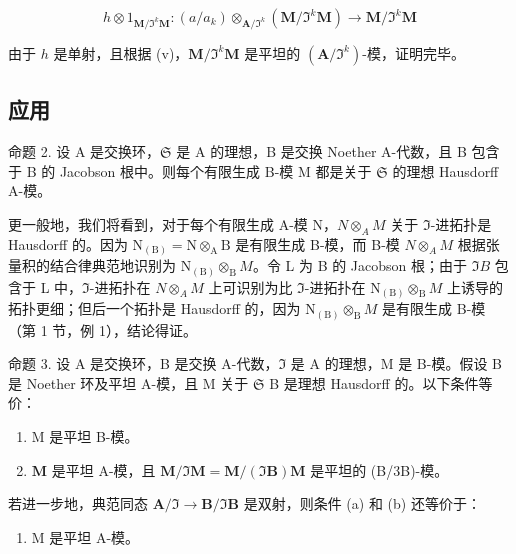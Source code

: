 \[
h \otimes 1 _ {\mathbf {M} / \Im^ {k} \mathbf {M}}: (a / a _ {k}) \otimes_ {\mathbf {A} / \Im^ {k}} (\mathbf {M} / \Im^ {k} \mathbf {M}) \rightarrow \mathbf {M} / \Im^ {k} \mathbf {M}
\]

由于 \(h\) 是单射，且根据 (v)，\(\mathbf{M} / \Im^k\mathbf{M}\) 是平坦的 \((\mathbf{A} / \Im^k)\)-模，证明完毕。

\subsection{应用}

命题 2. 设 A 是交换环，\(\mathfrak{S}\) 是 A 的理想，B 是交换 Noether A-代数，且 B 包含于 B 的 Jacobson 根中。则每个有限生成 B-模 M 都是关于 \(\mathfrak{S}\) 的理想 Hausdorff A-模。

更一般地，我们将看到，对于每个有限生成 A-模 N，\(N \otimes_{A} M\) 关于 \(\Im\)-进拓扑是 Hausdorff 的。因为 \(\mathrm{N}_{(\mathrm{B})} = \mathrm{N} \otimes_{\mathrm{A}} \mathrm{B}\) 是有限生成 B-模，而 B-模 \(N \otimes_{A} M\) 根据张量积的结合律典范地识别为 \(\mathrm{N}_{(\mathrm{B})} \otimes_{\mathrm{B}} M\)。令 L 为 B 的 Jacobson 根；由于 \(\Im B\) 包含于 L 中，\(\Im\)-进拓扑在 \(N \otimes_{A} M\) 上可识别为比 \(\Im\)-进拓扑在 \(\mathrm{N}_{(\mathrm{B})} \otimes_{\mathrm{B}} M\) 上诱导的拓扑更细；但后一个拓扑是 Hausdorff 的，因为 \(\mathrm{N}_{(\mathrm{B})} \otimes_{\mathrm{B}} M\) 是有限生成 B-模（第 1 节，例 1），结论得证。

命题 3. 设 A 是交换环，B 是交换 A-代数，\(\mathfrak{I}\) 是 A 的理想，M 是 B-模。假设 B 是 Noether 环及平坦 A-模，且 M 关于 \(\mathfrak{S}\) B 是理想 Hausdorff 的。以下条件等价：

\begin{enumerate}
\def\labelenumi{(\alph{enumi})}
\item
  M 是平坦 B-模。
\item
  \(\mathbf{M}\) 是平坦 A-模，且 \(\mathbf{M} / \Im \mathbf{M} = \mathbf{M} / (\Im \mathbf{B})\mathbf{M}\) 是平坦的 (B/3B)-模。
\end{enumerate}

若进一步地，典范同态 \(\mathbf{A} / \Im \to \mathbf{B} / \Im \mathbf{B}\) 是双射，则条件 (a) 和 (b) 还等价于：

\begin{enumerate}
\def\labelenumi{(\alph{enumi})}
\setcounter{enumi}{2}
\tightlist
\item
  M 是平坦 A-模。
\end{enumerate}

